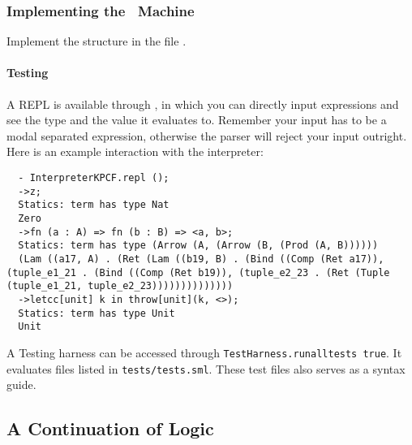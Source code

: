 \documentclass[11pt]{article}
\begin{document}
\subsubsection{Implementing the \MachK~Machine}

 Implement the structure  in the file .

\paragraph{Testing}

A REPL is available through , in which you can directly input \LangKPCF{}
expressions and see the type and the value it evaluates to. Remember your input has to be a modal
separated expression, otherwise the parser will reject your input outright. Here is an example interaction
with the interpreter:
\begin{lstlisting}
  - InterpreterKPCF.repl ();
  ->z;
  Statics: term has type Nat
  Zero
  ->fn (a : A) => fn (b : B) => <a, b>;
  Statics: term has type (Arrow (A, (Arrow (B, (Prod (A, B))))))
  (Lam ((a17, A) . (Ret (Lam ((b19, B) . (Bind ((Comp (Ret a17)), (tuple_e1_21 . (Bind ((Comp (Ret b19)), (tuple_e2_23 . (Ret (Tuple (tuple_e1_21, tuple_e2_23))))))))))))))
  ->letcc[unit] k in throw[unit](k, <>);
  Statics: term has type Unit
  Unit
\end{lstlisting}

A Testing harness can be accessed through \texttt{TestHarness.runalltests true}. It evaluates files listed in \texttt{tests/tests.sml}. These test files also serves as a syntax guide.

\subsection{A Continuation of Logic}
\end{document}

